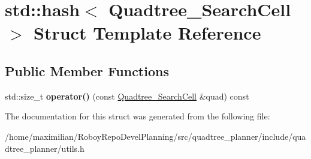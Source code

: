 \hypertarget{structstd_1_1hash_3_01Quadtree__SearchCell_01_4}{}\section{std\+:\+:hash$<$ Quadtree\+\_\+\+Search\+Cell $>$ Struct Template Reference}
\label{structstd_1_1hash_3_01Quadtree__SearchCell_01_4}
\subsection*{Public Member Functions}
\begin{DoxyCompactItemize}
\item 
\mbox{\label{structstd_1_1hash_3_01Quadtree__SearchCell_01_4_a49f5ed24c48f19ae41ad1c70590525c7}} 
std\+::size\+\_\+t {\bfseries operator()} (const \hyperlink{classQuadtree__SearchCell}{Quadtree\+\_\+\+Search\+Cell} \&quad) const
\end{DoxyCompactItemize}


The documentation for this struct was generated from the following file\+:\begin{DoxyCompactItemize}
\item 
/home/maximilian/\+Roboy\+Repo\+Devel\+Planning/src/quadtree\+\_\+planner/include/quadtree\+\_\+planner/utils.\+h\end{DoxyCompactItemize}
